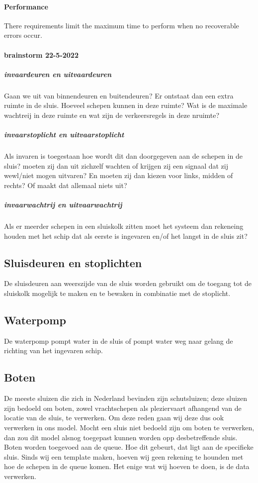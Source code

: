 \paragraph{Performance}
There requirements limit the maximum time to perform when no recoverable errors occur.



\paragraph{brainstorm 22-5-2022}

\subparagraph{invaardeuren en uitvaardeuren}
Gaan we uit van binnendeuren en buitendeuren? Er ontstaat dan een extra ruimte in de sluis. Hoeveel schepen kunnen in deze ruimte? Wat is de maximale wachtreij in deze ruimte en wat zijn de verkeersregels in deze nruimte?
\subparagraph{invaarstoplicht en uitvaarstoplicht}
Als invaren is toegestaan hoe wordt dit dan doorgegeven aan de schepen in de sluis? moeten zij dan uit zichzelf wachten of krijgen zij een signaal dat zij wewl/niet mogen uitvaren? En moeten zij dan kiezen voor links, midden of rechts? Of maakt dat allemaal niets uit?

\subparagraph{invaarwachtrij en uitvaarwachtrij}
Als er meerder schepen in een sluiskolk zitten moet het systeem dan rekeneing houden met het schip dat als eerste is ingevaren en/of het langst in de sluis zit?


\subsection{Sluisdeuren en stoplichten}
De sluisdeuren aan weerszijde van de sluis  worden gebruikt om de toegang tot de sluiskolk mogelijk te maken en te bewaken in combinatie met de stoplicht.



\subsection{Waterpomp}
De waterpomp pompt water in de sluis of pompt water weg naar gelang de richting van het ingevaren schip.

\subsection{Boten}
De meeste sluizen die zich in Nederland bevinden zijn schutsluizen; deze sluizen zijn bedoeld om boten, zowel vrachtschepen als pleziervaart afhangend van de locatie van de sluis, te verwerken. Om deze reden gaan wij deze dus ook verwerken in ons model. Mocht een sluis niet bedoeld zijn om boten te verwerken, dan zou dit model alsnog toegepast kunnen worden opp desbetreffende sluis.
Boten worden toegevoed aan de queue. Hoe dit gebeurt, dat ligt aan de specifieke sluis.  Sinds wij een template maken, hoeven wij geen rekening te hounden met hoe de schepen in de queue komen. Het enige wat wij hoeven te doen, is de data verwerken.




